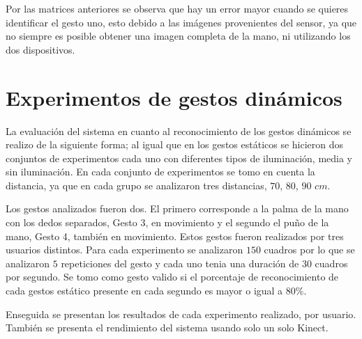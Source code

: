 Por las matrices anteriores se observa que hay un error mayor cuando se quieres identificar el gesto uno, esto debido a las imágenes provenientes del sensor, ya que no siempre es posible obtener una imagen completa de la mano, ni utilizando los dos dispositivos.  



\section{Experimentos de gestos dinámicos}\label{TestDinamicGestures} 

La evaluación del sistema en cuanto al reconocimiento de los gestos dinámicos se realizo de la siguiente forma; al igual que en los gestos estáticos se hicieron dos conjuntos de experimentos cada uno con diferentes tipos de iluminación, media y sin iluminación. En cada conjunto de experimentos se tomo en cuenta la distancia, ya que en cada grupo se analizaron tres distancias, $70$, $80$, $90$ $cm$. 

Los gestos analizados fueron dos. El primero corresponde a la palma de la mano con los dedos separados, Gesto 3, en movimiento y el segundo el puño de la mano, Gesto 4, también en movimiento. Estos gestos fueron realizados por tres usuarios distintos. Para cada experimento se analizaron $150$ cuadros por lo que se analizaron $5$ repeticiones del gesto y cada uno tenia una duración de $30$ cuadros por segundo. Se tomo como gesto valido si el porcentaje de reconocimiento de cada gestos estático presente en cada segundo es mayor o igual a $80 \%$.  

Enseguida se presentan los resultados de cada experimento realizado, por usuario. También se presenta el rendimiento del sistema usando solo un solo Kinect. 

